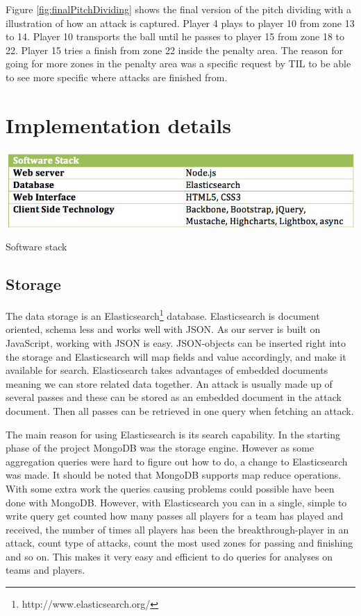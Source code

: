 Figure \ref{fig:finalPitchDividing} shows the final version of the pitch dividing with a illustration of how an attack is captured. Player 4 plays to player 10 from zone 13 to 14. Player 10 transports the ball until he passes to player 15 from zone 18 to 22. Player 15 tries a finish from zone 22 inside the penalty area. The reason for going for more zones in the penalty area was a specific request by \ac{TIL} to be able to see more specific where attacks are finished from.

\section{Implementation details}

\begin{table}[ht!]
\centering
\includegraphics[width=1\textwidth]{images/implementation/software_stack.png}
\caption{Software stack}
\end{table}

\subsection{Storage}

The data storage is an Elasticsearch\footnote{http://www.elasticsearch.org/} database. Elasticsearch is document oriented, schema less and works well with \ac{JSON}\footnotemark. As our server is built on JavaScript, working with \ac{JSON} is easy. \ac{JSON}-objects can be inserted right into the storage and Elasticsearch will map fields and value accordingly, and make it available for search.
Elasticsearch takes advantages of embedded documents meaning we can store related data together. An attack is usually made up of several passes and these can be stored as an embedded document in the attack document. Then all passes can be retrieved in one query when fetching an attack.

The main reason for using Elasticsearch is its search capability. In the starting phase of the project MongoDB \footnotemark was the storage engine. However as some aggregation queries were hard to figure out how to do, a change to Elasticsearch was made. It should be noted that MongoDB supports map reduce operations. With some extra work the queries causing problems could possible have been done with MongoDB. However, with Elasticsearch you can in a single, simple to write query get counted how many passes all players for a team has played and received, the number of times all players has been the breakthrough-player in an attack, count type of attacks, count the most used zones for passing and finishing and so on. This makes it very easy and efficient to do queries for analyses on teams and players.

